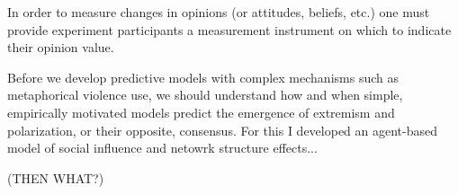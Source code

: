\documentclass[11pt,letterpaper]{article}
\begin{document}
In order to measure changes in opinions (or attitudes, beliefs, etc.) one must
provide experiment participants a measurement instrument on which to 
indicate their opinion value. 

Before we develop predictive models with complex mechanisms such as 
metaphorical violence use, we should understand how and when simple, empirically motivated
models predict the emergence of extremism and polarization, or their opposite,
consensus. For this I developed an agent-based model of social influence and
netowrk structure effects...~\cite{Turner2018}


(THEN WHAT?)

\end{document}
